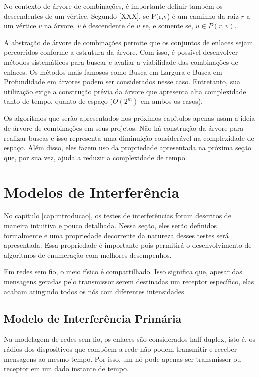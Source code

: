 No contexto de árvore de combinações, é importante definir também os descendentes de um vértice. Segundo [XXX], se P(r,v) é um caminho da raiz $r$ a um vértice $v$ na árvore, $v$ é descendente de $u$ se, e somente se, $u \in P(r,v)$. 

A abstração de árvore de combinações permite que os conjuntos de enlaces sejam percorridos conforme a estrutura da árvore. Com isso, é possível desenvolver métodos sistemáticos para buscar e avaliar a viabilidade das combinações de enlaces. Os métodos mais famosos como Busca em Largura e Busca em Profundidade em árvores podem ser considerados nesse caso. Entretanto, sua utilização exige a construção prévia da árvore que apresenta alta complexidade tanto de tempo, quanto de espaço ($O(2^m)$ em ambos os casos).

Os algoritmos que serão apresentados nos próximos capítulos apenas usam a ideia de árvore de combinações em seus projetos. Não há construção da árvore para realizar buscas e isso representa uma diminuição considerável na complexidade de espaço. Além disso, eles fazem uso da propriedade apresentada na próxima seção que, por sua vez, ajuda a reduzir a complexidade de tempo.

\section{Modelos de Interferência}

No capítulo \ref{cap:introducao}, os testes de interferências foram descritos de maneira intuitiva e pouco detalhada. Nessa seção, eles serão definidos formalmente e uma propriedade decorrente da natureza desses testes será apresentada. Essa propriedade é importante pois permitirá o desenvolvimento de algoritmos de enumeração com melhores desempenhos.

Em redes sem fio, o meio físico é compartilhado. Isso significa que, apesar das mensagens geradas pelo transmissor serem destinadas um receptor específico, elas acabam atingindo todos os nós com diferentes intensidades.

\subsection{Modelo de Interferência Primária}

Na modelagem de redes sem fio, os enlaces são considerados half-duplex, isto é, os rádios dos dispositivos que compõem a rede não podem transmitir e receber mensagens ao mesmo tempo. Por isso, um nó pode apenas ser transmissor ou receptor em um dado instante de tempo.
 
